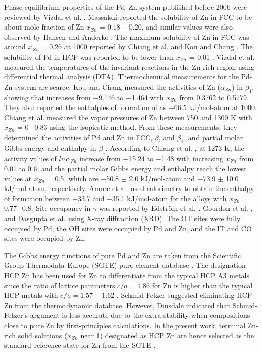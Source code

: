 Phase equilibrium properties of the Pd–Zn system published before 2006 were reviewed by Vizdal et al. \cite{vizdal2006experimental}. Massalski \cite{massalski1986binary} reported the solubility of Zn in FCC to be about mole fraction of Zn $x_{Zn}$ = $0.18 - 0.20$, and similar values were also observed by Hansen and Anderko \cite{hansen1958constitution}. The maximum solubility of Zn in FCC was around $x_{Zn}$ = $0.26$ at 1000 reported by Chiang et al. \cite{ChiangIpserChang1977} and Kou and Chang \cite{kou1975thermodynamics}. The solubility of Pd in HCP was reported to be lower than $x_{Zn}$ = 0.01 \cite{vizdal2006experimental, massalski1986binary, hansen1958constitution}. Vizdal et al. \cite{vizdal2006experimental} measured the temperatures of the invariant reactions in the Zn-rich region using differential thermal analysis (DTA). Thermochemical measurements for the Pd-Zn system are scarce. Kou and Chang \cite{kou1975thermodynamics} measured the activities of Zn ($\alpha_{Zn}$) in $\beta_1$, showing that increases from $-$9.146 to $-$1.464 with $x_{Zn}$ from 0.3762 to 0.5779. They also reported the enthalpies of formation of as $-66.5$ kJ/mol-atom at 1000. Chiang et al. \cite{ChiangIpserChang1977} measured the vapor pressures of Zn between 750 and 1300 K with $x_{Zn}$ = 0$-$0.83 using the isopiestic method. From these measurements, they determined the activities of Pd and Zn in FCC, $\beta$, and $\beta_1$, and partial molar Gibbs energy and enthalpy in $\beta_1$. According to Chiang et al. \cite{ChiangIpserChang1977}, at 1273 K, the activity values of $ln\alpha_{Zn}$ increase from −15.24 to −1.48 with increasing $x_{Zn}$ from 0.01 to 0.6; and the partial molar Gibbs energy and enthalpy reach the lowest values at $x_{Zn}$ = 0.5, which are $-$50.8 $\pm$ 2.0 kJ/mol-atom and $-$73.9 $\pm$ 10.0 kJ/mol-atom, respectively. Amore et al. \cite{amore2009thermochemistry} used calorimetry to obtain the enthalpy of formation between −33.7 and −35.1 kJ/mol-atom for the alloys with $x_{Zn}$ = 0.77$-$0.8. Site occupancy in $\gamma$ was reported by Edström et al. \cite{strom1969x}, Gourdon et al. \cite{gourdon2006intergrowth}, and Dasgupta et al. \cite{Dasgupta2022} using X-ray diffraction (XRD). The OT sites were fully occupied by Pd, the OH sites were occupied by Pd and Zn, and the IT and CO sites were occupied by Zn.

The Gibbs energy functions of pure Pd and Zn are taken from the Scientific Group Thermodata Europe (SGTE) pure element database \cite{dinsdale1991sgte}. The designation HCP$\_$Zn has been used for Zn to differentiate from the typical HCP$\_$A3 metals since the ratio of lattice parameters $c/a = 1.86$ for Zn is higher than the typical HCP metals with $c/a = 1.57 - 1.62$ \cite{schmid2012zinc}. Schmid-Fetzer \cite{schmid2012zinc} suggested eliminating HCP$\_$Zn from the thermodynamic database. However, Dinsdale \cite{dinsdale2021modelling} indicated that Schmid-Fetzer's argument is less accurate due to the extra stability when compositions close to pure Zn by first-principles calculations. In the present work, terminal Zn-rich solid solutions ($x_{Zn}$ near 1) designated as HCP$\_$Zn are hence selected as the standard reference state for Zn from the SGTE \cite{dinsdale1991sgte}.

